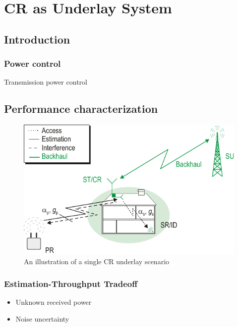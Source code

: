 \chapter{CR as Underlay System}
\label{chapter:US}

\section{Introduction}
\subsection{Power control}
Transmission power control

\section{Performance characterization}
\begin{figure}[!t]
	\centering
     \includegraphics[trim=0cm 0.0cm 0.0cm 0cm,clip=true,width=0.8\columnwidth]{../kapitel04/figures/CR_Scenario_Underlay}
\caption{An illustration of a single \ac{CR} underlay scenario}
\label{fig:Und_Sc}
\end{figure}

\subsection{Estimation-Throughput Tradeoff}
\begin{itemize}
\item Unknown received power
\item Noise uncertainty
\end{itemize}

